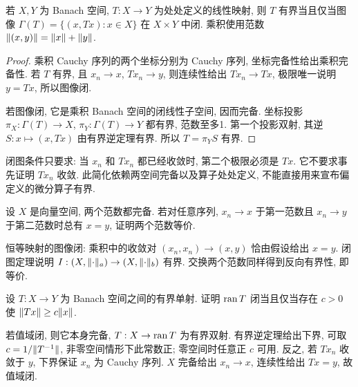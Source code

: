 \begin{theorem}[闭图定理]\label{thm:closedgraph}
若 $X,Y$ 为 Banach 空间, $T:X\to Y$ 为处处定义的线性映射, 则 $T$ 有界当且仅当图像 $\Gamma(T)=\{(x,Tx):x\in X\}$ 在 $X\times Y$ 中闭. 乘积使用范数 $\lVert (x,y)\rVert=\lVert x\rVert+\lVert y\rVert$.
\end{theorem}
\begin{proof}
乘积 Cauchy 序列的两个坐标分别为 Cauchy 序列, 坐标完备性给出乘积完备性. 若 $T$ 有界, 且 $x_n\to x$, $Tx_n\to y$, 则连续性给出 $Tx_n\to Tx$, 极限唯一说明 $y=Tx$, 所以图像闭.

若图像闭, 它是乘积 Banach 空间的闭线性子空间, 因而完备. 坐标投影 $\pi_X:\Gamma(T)\to X$, $\pi_Y:\Gamma(T)\to Y$ 都有界, 范数至多1. 第一个投影双射, 其逆 $S:x\mapsto(x,Tx)$ 由有界逆定理有界. 所以 $T=\pi_YS$ 有界.
\end{proof}
闭图条件只要求: 当 $x_n$ 和 $Tx_n$ 都已经收敛时, 第二个极限必须是 $Tx$. 它不要求事先证明 $Tx_n$ 收敛. 此简化依赖两空间完备以及算子处处定义, 不能直接用来宣布偏定义的微分算子有界.

\begin{exercise}\label{legacy:ch04:exercise1}
设 $X$ 是向量空间, 两个范数都完备. 若对任意序列, $x_n\to x$ 于第一范数且 $x_n\to y$ 于第二范数时总有 $x=y$, 证明两个范数等价.
\end{exercise}
\begin{solution}
恒等映射的图像闭: 乘积中的收敛对 $(x_n,x_n)\to(x,y)$ 恰由假设给出 $x=y$. 闭图定理说明 $I:(X,\lVert \cdot\rVert_a)\to(X,\lVert \cdot\rVert_b)$ 有界. 交换两个范数同样得到反向有界性, 即等价.
\end{solution}

\begin{exercise}\label{legacy:ch04:exercise2}
设 $T:X\to Y$ 为 Banach 空间之间的有界单射. 证明 $\operatorname{ran} T$ 闭当且仅当存在 $c>0$ 使 $\lVert Tx\rVert\ge c\lVert x\rVert$.
\end{exercise}
\begin{solution}
若值域闭, 则它本身完备, $T:X\to\operatorname{ran} T$ 为有界双射. 有界逆定理给出下界, 可取 $c=1/\lVert T^{-1}\rVert$, 非零空间情形下此常数正; 零空间时任意正 $c$ 可用. 反之, 若 $Tx_n$ 收敛于 $y$, 下界保证 $x_n$ 为 Cauchy 序列. $X$ 完备给出 $x_n\to x$, 连续性给出 $Tx=y$, 故值域闭.
\end{solution}
